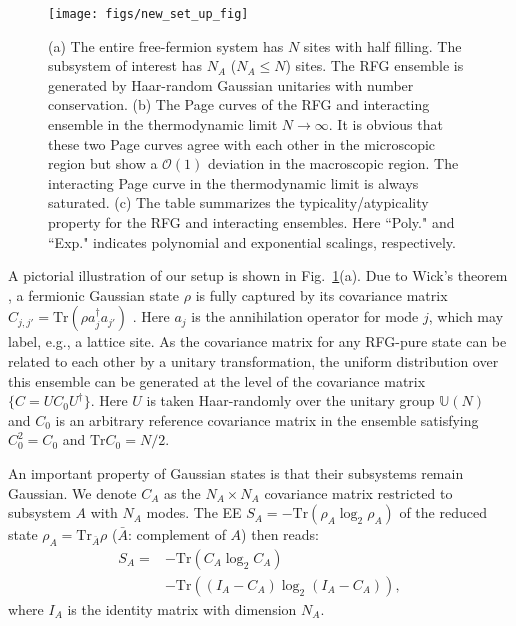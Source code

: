 \documentclass[twocolumn,english,prl,aps,superscriptaddress,amsmath,amssymb,floatfix]{revtex4-2}
\def \Tr {\mathrm{Tr}}
\begin{document}
\begin{figure}
\texttt{[image: figs/new\_set\_up\_fig]}\caption{(a) The entire 
free-fermion system has $N$ sites with half filling. The 
subsystem of interest 
has $N_{A}$ ($N_{A}\le N$) sites. 
The RFG ensemble is generated by Haar-random Gaussian unitaries with number conservation. 
(b) 
The Page curves of the RFG 
and interacting ensemble in the thermodynamic limit $N\to\infty$. 
It is obvious that these two Page curves agree with each other in the microscopic region but show a $\mathcal{O}(1)$ deviation in the macroscopic region. The interacting Page curve in the thermodynamic limit is always saturated. (c) The table summarizes the typicality/atypicality property for the RFG and interacting ensembles. Here ``Poly." and ``Exp." indicates polynomial and exponential scalings, respectively.}
\label{Setup_of_CCRFG_ensemble}
\end{figure}

A pictorial illustration of our setup is shown 
in Fig.~\ref{Setup_of_CCRFG_ensemble}(a). 
Due to Wick's theorem \citep{Hackl2021}, a fermionic Gaussian 
state $\rho$ is 
fully captured 
by its covariance matrix $C_{j,j'}=\mathrm{Tr}(\rho a_{j}^{\dagger}a_{j'})$ \cite{Peschel2003}.
Here $a_{j}$ is the annihilation operator for mode $j$, which may label, e.g., a lattice site. 
As the covariance matrix for any RFG-pure state can be related to each
other by a unitary transformation, 
the uniform distribution over this ensemble can be generated at the
level of the covariance matrix $\{C=UC_{0}U^{\dagger}\}$. Here 
$U$ is taken Haar-randomly over the unitary group $\mathbb{U}(N)$ 
\citep{Bianchi2021,Bianchi2021a} and
$C_{0}$ is an arbitrary reference %
covariance matrix in the ensemble satisfying $C_0^2=C_0$ and $\Tr C_0=N/2$. 

An important property of Gaussian states is that their subsystems remain Gaussian. 
We denote $C_{A}$ as the $N_A\times N_A$ covariance matrix restricted
to subsystem $A$ with $N_A$ modes. The EE $S_A=-\Tr(\rho_A\log_2\rho_A)$ of the reduced state $\rho_A=\Tr_{\bar A}\rho$ ($\bar A$: complement of $A$) then reads:
\begin{equation}
\begin{split}
    S_{A}=&-\Tr(C_A\log_2 C_A)\\
    &-\Tr((I_A-C_A)\log_2 (I_A-C_A)), 
    \end{split}
    \label{eq:SA}
\end{equation}
where $I_A$ is the identity matrix with dimension $N_A$.
\end{document}
